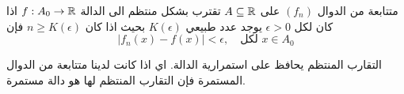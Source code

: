 \begin{definition}
	متتابعة من الدوال $(f_n)$ على $A\subseteq\mathbb{R}$ تقترب بشكل منتظم الى الدالة $f:A_0\to\mathbb{R}$ اذا كان لكل $\epsilon>0$ يوجد عدد طبيعي $K(\epsilon)$ بحيث اذا كان $n\geq K(\epsilon)$ فإن 
	\[
	|f_n(x) - f(x) | < \epsilon, \quad \text{لكل $x\in A_0$}
	\]
\end{definition}

\begin{note}
	التقارب المنتظم يحافظ على استمرارية الدالة. اي اذا كانت لدينا متتابعة من الدوال المستمرة فإن التقارب المنتظم لها هو دالة مستمرة.
\end{note}
